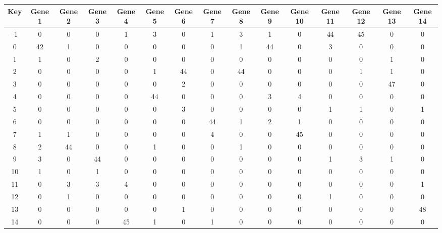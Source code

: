 \begin{tabular}{|c|c|c|c|c|c|c|c|c|c|c|c|c|c|c|}
\hline
Key & Gene 1 & Gene 2 & Gene 3 & Gene 4 & Gene 5 & Gene 6 & Gene 7 & Gene 8 & Gene 9 & Gene 10 & Gene 11 & Gene 12 & Gene 13 & Gene 14 \\
\hline
-1 & 0 & 0 & 0 & 1 & 3 & 0 & 1 & 3 & 1 & 0 & 44 & 45 & 0 & 0 \\
0 & 42 & 1 & 0 & 0 & 0 & 0 & 0 & 1 & 44 & 0 & 3 & 0 & 0 & 0 \\
1 & 1 & 0 & 2 & 0 & 0 & 0 & 0 & 0 & 0 & 0 & 0 & 0 & 1 & 0 \\
2 & 0 & 0 & 0 & 0 & 1 & 44 & 0 & 44 & 0 & 0 & 0 & 1 & 1 & 0 \\
3 & 0 & 0 & 0 & 0 & 0 & 2 & 0 & 0 & 0 & 0 & 0 & 0 & 47 & 0 \\
4 & 0 & 0 & 0 & 0 & 44 & 0 & 0 & 0 & 3 & 4 & 0 & 0 & 0 & 0 \\
5 & 0 & 0 & 0 & 0 & 0 & 3 & 0 & 0 & 0 & 0 & 1 & 1 & 0 & 1 \\
6 & 0 & 0 & 0 & 0 & 0 & 0 & 44 & 1 & 2 & 1 & 0 & 0 & 0 & 0 \\
7 & 1 & 1 & 0 & 0 & 0 & 0 & 4 & 0 & 0 & 45 & 0 & 0 & 0 & 0 \\
8 & 2 & 44 & 0 & 0 & 1 & 0 & 0 & 1 & 0 & 0 & 0 & 0 & 0 & 0 \\
9 & 3 & 0 & 44 & 0 & 0 & 0 & 0 & 0 & 0 & 0 & 1 & 3 & 1 & 0 \\
10 & 1 & 0 & 1 & 0 & 0 & 0 & 0 & 0 & 0 & 0 & 0 & 0 & 0 & 0 \\
11 & 0 & 3 & 3 & 4 & 0 & 0 & 0 & 0 & 0 & 0 & 0 & 0 & 0 & 1 \\
12 & 0 & 1 & 0 & 0 & 0 & 0 & 0 & 0 & 0 & 0 & 1 & 0 & 0 & 0 \\
13 & 0 & 0 & 0 & 0 & 0 & 1 & 0 & 0 & 0 & 0 & 0 & 0 & 0 & 48 \\
14 & 0 & 0 & 0 & 45 & 1 & 0 & 1 & 0 & 0 & 0 & 0 & 0 & 0 & 0 \\
\hline
\end{tabular}